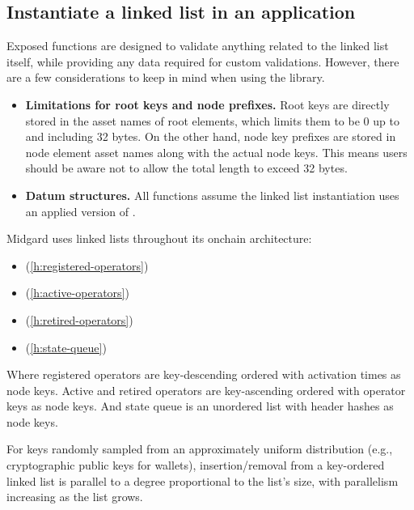 \documentclass[../midgard.tex]{subfiles}
\begin{document}
\subsection{Instantiate a linked list in an application}
\label{h:instantiate-list-in-application}

Exposed functions are designed to validate anything related to the linked list itself, while providing any data required for custom validations.
However, there are a few considerations to keep in mind when using the library.
\begin{itemize}
  \item \textbf{Limitations for root keys and node prefixes.} Root keys are directly stored in the asset names of root elements, which limits them to be 0 up to and including 32 bytes.
    On the other hand, node key prefixes are stored in node element asset names along with the actual node keys.
    This means users should be aware not to allow the total length to exceed 32 bytes.
  \item \textbf{Datum structures.} All functions assume the linked list instantiation uses an applied version of .
\end{itemize}

Midgard uses linked lists throughout its onchain architecture:
\begin{itemize}
    \item {} (\cref{h:registered-operators})
    \item {} (\cref{h:active-operators})
    \item {} (\cref{h:retired-operators})
    \item {} (\cref{h:state-queue})
\end{itemize}

Where registered operators are key-descending ordered with activation times as node keys.
Active and retired operators are key-ascending ordered with operator keys as node keys.
And state queue is an unordered list with header hashes as node keys.

\label{h:parallel-insertions-in-key-ordered-lists}

For keys randomly sampled from an approximately uniform distribution (e.g., cryptographic public keys for wallets), insertion/removal from a key-ordered linked list is parallel to a degree proportional to the list's size, with parallelism increasing as the list grows.
\end{document}
